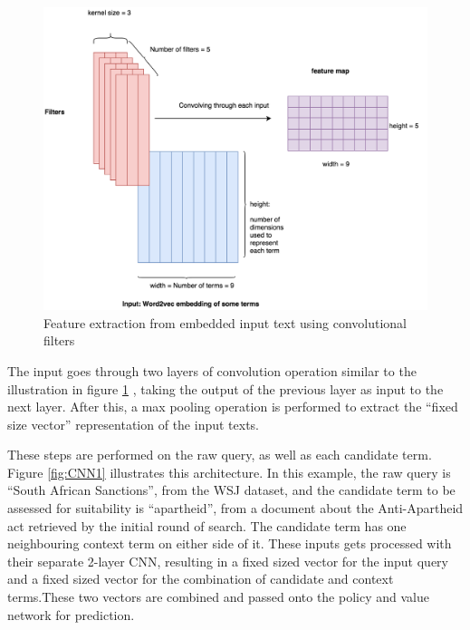 \begin{figure}[H]
  \centering
    \includegraphics[width=1\textwidth]{images/chapter_4/Chapter_4-CNN2.png}
    
  \caption{Feature extraction from embedded input text using convolutional filters}
    \label{fig:CNN2}
\end{figure}


The input goes through two layers of convolution operation similar to the illustration in figure \ref{fig:CNN2} , taking the output of the previous layer as input to the next layer. After this, a max pooling operation is performed to extract the ``fixed size vector'' representation of the input texts. 

These steps are performed on the raw query, as well as each candidate term.   Figure \ref{fig:CNN1} illustrates this architecture. In this example, the raw query is ``South African Sanctions'', from the WSJ dataset, and the candidate term to be assessed for suitability is ``apartheid'', from a document about the Anti-Apartheid act retrieved by the initial round of search. The candidate term has one neighbouring context term on either side of it. These inputs gets processed with their separate 2-layer CNN, resulting in a fixed sized vector for the input query and a fixed sized vector for the combination of candidate and context terms.These two vectors are combined and passed onto the policy and value network for prediction.

